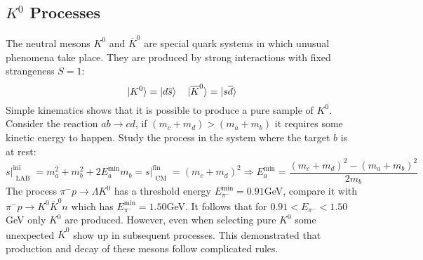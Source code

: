 \documentclass[10.75pt,a4paper,openright,bottom=2cm]{article}
\begin{document}
\subsection{$K^0$ Processes}
The neutral mesons $K^0$ and $\overline{K}^0$ are special quark systems in which unusual phenomena take place. They are produced by strong interactions with fixed strangeness $S=1$:
\[
\ket{K^0}=\ket{d\overline{s}} \quad \ket{\overline{K}^0}=\ket{s\overline{d}}
\]
Simple kinematics shows that it is possible to produce a pure sample of $K^0$. Consider the reaction $ab\to cd$, if $(m_c+m_d)>(m_a+m_b)$ it requires some kinetic energy to happen. Study the process in the system where the target $b$ is at rest:
\[
s\Bigr|_{\substack{\text{LAB}}}^{\text{ini}}=m_a^2+m_b^2+2E_a^{\min} m_b=s\Bigr|_{\substack{\text{CM}}}^{\text{fin}}=(m_c+m_d)^2\Rightarrow E_a^{\min}=\frac{(m_c+m_d)^2-(m_a+m_b)^2}{2m_b}
\]
The process $\pi^- p\to\Lambda K^0$ has a threshold energy $E_{\pi^-}^{\min}=0.91$\;GeV, compare it with\\
$\pi^- p\to K^0\overline{K}^0n$ which has $E_{\pi^-}^{\min}=1.50$\;GeV. It follows that for $0.91<E_{\pi^-}<1.50$\;GeV only $K^0$ are produced. However, even when selecting pure $K^0$ some unexpected $\overline{K}^0$ show up in subsequent processes. This demonstrated that production and decay of these mesons follow complicated rules.
\end{document}
